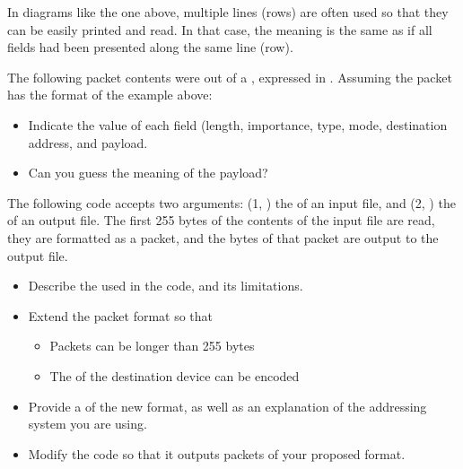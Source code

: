 \begin{remark}
In diagrams like the one above, multiple lines (rows) are often used so that they can be
easily printed and read. In that case, the meaning is the same as if all fields had been
presented along the same line (row).
\end{remark}

\begin{exercise}
The following packet contents were  out of a ,
expressed in . Assuming the packet has the format of the example above:
% 
\begin{itemize}
\item Indicate the value of each field (length, importance, type, mode, destination address, and payload.
\item Can you guess the meaning of the payload?
\end{itemize}
% 
\begin{center}
\end{center}
\end{exercise}

\begin{exercise}
The following code accepts two arguments: (1, ) the  of an input file, 
and (2, ) the  of an output file.
The first 255 bytes of the contents of the input file are read, 
they are formatted as a packet, and the bytes of that packet
are output to the output file.

\begin{center}
\end{center}

\begin{itemize}
\item Describe the  used in the code, and its limitations.

\item Extend the packet format so that 
 \begin{itemize}
   \item Packets can be longer than 255 bytes
   \item The  of the destination device can be encoded
  \end{itemize}
  
\item Provide a  of the new format, 
as well as an explanation of the addressing system you are using.

\item Modify the code so that it outputs packets of your proposed format.
\end{itemize}
\end{exercise}

